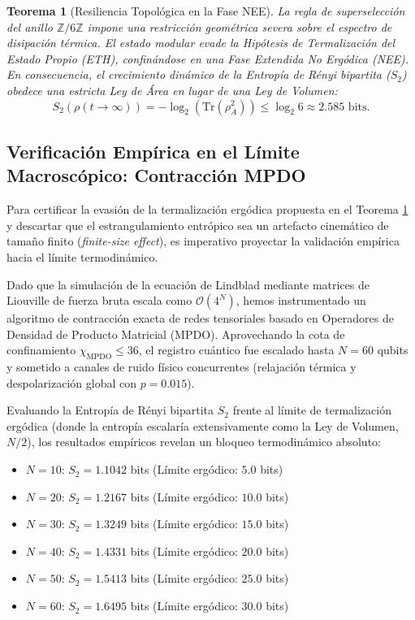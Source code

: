 \documentclass[12pt,a4paper]{article}
\theoremstyle{plain}
\newtheorem{teorema}{Teorema}[section]
\theoremstyle{definition}
\theoremstyle{remark}
\begin{document}
\begin{teorema}[Resiliencia Topológica en la Fase NEE]
\label{teo:parent_lindbladian}
La regla de superselección del anillo $\mathbb{Z}/6\mathbb{Z}$ impone una restricción geométrica severa sobre el espectro de disipación térmica. El estado modular evade la Hipótesis de Termalización del Estado Propio (ETH), confinándose en una Fase Extendida No Ergódica (NEE). En consecuencia, el crecimiento dinámico de la Entropía de Rényi bipartita ($S_2$) obedece una estricta Ley de Área en lugar de una Ley de Volumen:
\begin{equation}
S_2(\rho(t \to \infty)) = -\log_2(\text{Tr}(\rho_A^2)) \le \log_2 6 \approx 2.585 \text{ bits}.
\end{equation}
\end{teorema}

\subsection{Verificación Empírica en el Límite Macroscópico: Contracción MPDO}
\label{subsec:verificacion_empirica}

Para certificar la evasión de la termalización ergódica propuesta en el Teorema \ref{teo:parent_lindbladian} y descartar que el estrangulamiento entrópico sea un artefacto cinemático de tamaño finito (\textit{finite-size effect}), es imperativo proyectar la validación empírica hacia el límite termodinámico. 

Dado que la simulación de la ecuación de Lindblad mediante matrices de Liouville de fuerza bruta escala como $\mathcal{O}(4^N)$, hemos instrumentado un algoritmo de contracción exacta de redes tensoriales basado en Operadores de Densidad de Producto Matricial (MPDO). Aprovechando la cota de confinamiento $\chi_{\text{MPDO}} \le 36$, el registro cuántico fue escalado hasta $N=60$ qubits y sometido a canales de ruido físico concurrentes (relajación térmica y despolarización global con $p=0.015$).

Evaluando la Entropía de Rényi bipartita $S_2$ frente al límite de termalización ergódica (donde la entropía escalaría extensivamente como la Ley de Volumen, $N/2$), los resultados empíricos revelan un bloqueo termodinámico absoluto:

\begin{itemize}
    \item $N=10$: $S_2 = 1.1042$ bits (Límite ergódico: $5.0$ bits)
    \item $N=20$: $S_2 = 1.2167$ bits (Límite ergódico: $10.0$ bits)
    \item $N=30$: $S_2 = 1.3249$ bits (Límite ergódico: $15.0$ bits)
    \item $N=40$: $S_2 = 1.4331$ bits (Límite ergódico: $20.0$ bits)
    \item $N=50$: $S_2 = 1.5413$ bits (Límite ergódico: $25.0$ bits)
    \item $N=60$: $S_2 = 1.6495$ bits (Límite ergódico: $30.0$ bits)
\end{itemize}
\end{document}
